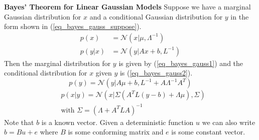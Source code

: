 \documentclass[../masters.tex]{subfiles}
\begin{document}
\begin{thrm}
\textbf{Bayes' Theorem for Linear Gaussian Models}
Suppose we have a marginal Gaussian distribution for $x$ and a conditional Gaussian distribution for $y$ in the form shown in (\ref{eq_bayes_gauss_suppose}).
\begin{equation}
\begin{aligned}
p(x) &= \mathcal{N}(x|\mu,\Lambda^{-1}) \\
p(y|x) &= \mathcal{N}(y|Ax + b, L^{-1}) 
\end{aligned}
\label{eq_bayes_gauss_suppose}
\end{equation} 
Then the marginal distribution for $y$ is given by (\ref{eq_bayes_gauss1}) and the conditional distribution for $x$ given $y$ is (\ref{eq_bayes_gauss2}).
\begin{equation}
p(y) = \mathcal{N}(y|A\mu + b, L^{-1}+A\Lambda^{-1}A^T)
\label{eq_bayes_gauss1}
\end{equation}
\begin{equation}
\begin{aligned}
&p(x|y) = \mathcal{N}(x|\Sigma(A^TL(y-b)+\Lambda\mu), \Sigma) \\
&\text{with } \Sigma = (\Lambda + A^TLA)^{-1}
\end{aligned}
\label{eq_bayes_gauss2}
\end{equation}
\label{thrm_bayes_gaussians}
Note that $b$ is a known vector. Given a deterministic function $u$ we can also write $b = Bu + e$ where $B$ is some conforming matrix and $e$ is some constant vector. 
\end{thrm}
\end{document}
